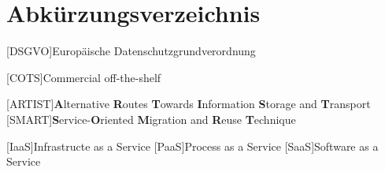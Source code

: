 \chapter*{Abkürzungsverzeichnis}
	\begin{acronym}[DSGVO] %
	    [DSGVO]{Europäische Datenschutzgrundverordnung}
	\end{acronym}
	\begin{acronym}[COTS] %
	    [COTS]{Commercial off-the-shelf}
	\end{acronym}
	

	\begin{acronym}[ARTIST] 
	    [ARTIST]{\textbf{A}lternative \textbf{R}outes \textbf{T}owards \textbf{I}nformation \textbf{S}torage and \textbf{T}ransport}
	     [SMART]{\textbf{S}ervice-\textbf{O}riented \textbf{M}igration and \textbf{R}euse \textbf{T}echnique}
	\end{acronym}

	\begin{acronym}[AsAService] 
	   [IaaS]{Infrastructe as a Service}
	   [PaaS]{Process as a Service}
	   [SaaS]{Software as a Service}
	  \end{acronym}
	    
	    
